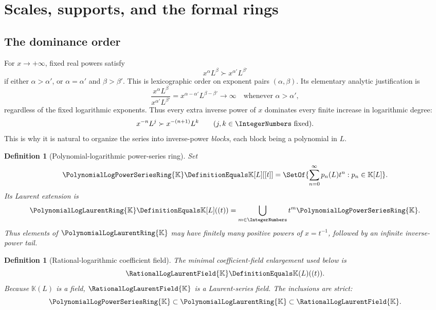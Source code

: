 \documentclass[11pt]{article}
\theoremstyle{pltheorem}
\newtheorem{definition}[theorem]{Definition}
\newcommand{\K}{\mathbb K}
\newcommand{\PL}{\PolynomialLogPowerSeriesRing{\K}}
\newcommand{\PLL}{\PolynomialLogLaurentRing{\K}}
\newcommand{\QPL}{\RationalLogLaurentField{\K}}
\begin{document}
\section{Scales, supports, and the formal rings}
\label{sec:formal-rings}

\subsection{The dominance order}

For \(x\to+\infty\), fixed real powers satisfy
\[
 x^\alpha L^\beta \succ x^{\alpha'}L^{\beta'}
\]
if either \(\alpha>\alpha'\), or \(\alpha=\alpha'\) and \(\beta>\beta'\).  This is lexicographic order on exponent pairs \((\alpha,\beta)\).  Its elementary analytic justification is
\begin{equation}\label{eq:power-beats-log}
 \frac{x^\alpha L^\beta}{x^{\alpha'}L^{\beta'}}
 =x^{\alpha-\alpha'}L^{\beta-\beta'}\longrightarrow\infty
 \quad\text{whenever }\alpha>\alpha',
\end{equation}
regardless of the fixed logarithmic exponents.  Thus every extra inverse power of \(x\) dominates every finite increase in logarithmic degree:
\begin{equation}\label{eq:block-order}
 x^{-n}L^j\succ x^{-(n+1)}L^k
 \qquad(j,k\in\IntegerNumbers\text{ fixed}).
\end{equation}
This is why it is natural to organize the series into inverse-power \emph{blocks}, each block being a polynomial in \(L\).

\begin{definition}[Polynomial-logarithmic power-series ring]
Set
\begin{equation}\label{eq:P-def}
 \PL\DefinitionEquals\K[L][[t]]
 =\SetOf{\sum_{n=0}^{\infty}p_n(L)t^n:p_n\in\K[L]}.
\end{equation}
Its Laurent extension is
\begin{equation}\label{eq:PLaur-def}
 \PLL\DefinitionEquals\K[L]((t))
 =\bigcup_{m\in\IntegerNumbers}t^m\PL.
\end{equation}
Thus elements of \(\PLL\) may have finitely many positive powers of \(x=t^{-1}\), followed by an infinite inverse-power tail.
\end{definition}

\begin{definition}[Rational-logarithmic coefficient field]
The minimal coefficient-field enlargement used below is
\begin{equation}\label{eq:QPL-def}
 \QPL\DefinitionEquals\K(L)((t)).
\end{equation}
Because \(\K(L)\) is a field, \(\QPL\) is a Laurent-series field.  The inclusions are strict:
\[
 \PL\subset\PLL\subset\QPL.
\]
\end{definition}
\end{document}
